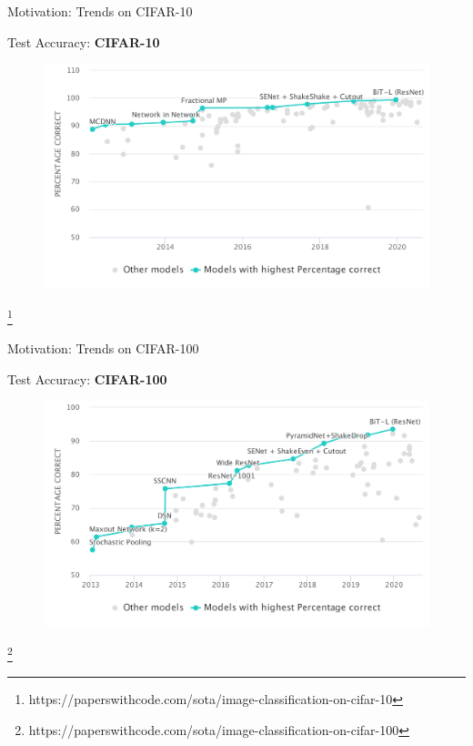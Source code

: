 \documentclass[mathserif,notheorems, hyperref={colorlinks, citecolor=blue, urlcolor=blue, linkcolor=blue}]{beamer}
\newcommand{\source}[1]{{\let\thefootnote\relax\footnote{{\tiny #1}}}}
\begin{document}
    \begin{frame}{Motivation: Trends on CIFAR-10} 
        \begin{center}
            \Large Test Accuracy: \textbf{CIFAR-10}
        \end{center}

        \begin{figure}[]
            \centering
            \includegraphics[width=\linewidth]{figures/Cifar10}
        \end{figure} 

        \source{https://paperswithcode.com/sota/image-classification-on-cifar-10}
    \end{frame}

    \begin{frame}{Motivation: Trends on CIFAR-100} 
        \begin{center}
            \Large Test Accuracy: \textbf{CIFAR-100}
        \end{center}

        \begin{figure}[]
            \centering
            \includegraphics[width=\linewidth]{figures/Cifar100}
        \end{figure} 

        \source{https://paperswithcode.com/sota/image-classification-on-cifar-100}
    \end{frame}
\end{document}

